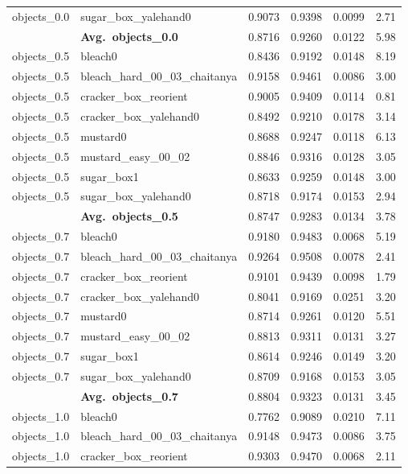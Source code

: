 \begin{longtable}{llrrrr}
  objects_0.0 & sugar\_box\_yalehand0 & 0.9073 & 0.9398 & 0.0099 & 2.71 \\
  \cmidrule{2-6}
  & \textbf{Avg.~objects_0.0} & 0.8716 & 0.9260 & 0.0122 & 5.98 \\
  \midrule
  objects_0.5 & bleach0 & 0.8436 & 0.9192 & 0.0148 & 8.19 \\
  objects_0.5 & bleach\_hard\_00\_03\_chaitanya & 0.9158 & 0.9461 & 0.0086 & 3.00 \\
  objects_0.5 & cracker\_box\_reorient & 0.9005 & 0.9409 & 0.0114 & 0.81 \\
  objects_0.5 & cracker\_box\_yalehand0 & 0.8492 & 0.9210 & 0.0178 & 3.14 \\
  objects_0.5 & mustard0 & 0.8688 & 0.9247 & 0.0118 & 6.13 \\
  objects_0.5 & mustard\_easy\_00\_02 & 0.8846 & 0.9316 & 0.0128 & 3.05 \\
  objects_0.5 & sugar\_box1 & 0.8633 & 0.9259 & 0.0148 & 3.00 \\
  objects_0.5 & sugar\_box\_yalehand0 & 0.8718 & 0.9174 & 0.0153 & 2.94 \\
  \cmidrule{2-6}
  & \textbf{Avg.~objects_0.5} & 0.8747 & 0.9283 & 0.0134 & 3.78 \\
  \midrule
  objects_0.7 & bleach0 & 0.9180 & 0.9483 & 0.0068 & 5.19 \\
  objects_0.7 & bleach\_hard\_00\_03\_chaitanya & 0.9264 & 0.9508 & 0.0078 & 2.41 \\
  objects_0.7 & cracker\_box\_reorient & 0.9101 & 0.9439 & 0.0098 & 1.79 \\
  objects_0.7 & cracker\_box\_yalehand0 & 0.8041 & 0.9169 & 0.0251 & 3.20 \\
  objects_0.7 & mustard0 & 0.8714 & 0.9261 & 0.0120 & 5.51 \\
  objects_0.7 & mustard\_easy\_00\_02 & 0.8813 & 0.9311 & 0.0131 & 3.27 \\
  objects_0.7 & sugar\_box1 & 0.8614 & 0.9246 & 0.0149 & 3.20 \\
  objects_0.7 & sugar\_box\_yalehand0 & 0.8709 & 0.9168 & 0.0153 & 3.05 \\
  \cmidrule{2-6}
  & \textbf{Avg.~objects_0.7} & 0.8804 & 0.9323 & 0.0131 & 3.45 \\
  \midrule
  objects_1.0 & bleach0 & 0.7762 & 0.9089 & 0.0210 & 7.11 \\
  objects_1.0 & bleach\_hard\_00\_03\_chaitanya & 0.9148 & 0.9473 & 0.0086 & 3.75 \\
  objects_1.0 & cracker\_box\_reorient & 0.9303 & 0.9470 & 0.0068 & 2.11 \\

\end{longtable}
